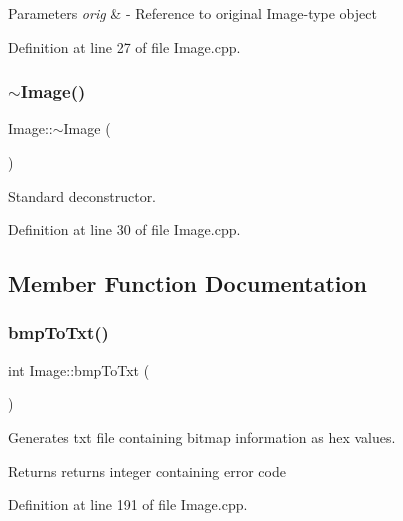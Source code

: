 \begin{DoxyParams}{Parameters}
{\em orig} & -\/ Reference to original Image-\/type object \\
\hline
\end{DoxyParams}


Definition at line 27 of file Image.\+cpp.

\mbox{\label{classImage_a0294f63700543e11c0f0da85601c7ae5}} 
\subsubsection{\texorpdfstring{$\sim$Image()}{~Image()}}
{\footnotesize\ttfamily Image\+::$\sim$\+Image (\begin{DoxyParamCaption}{ }\end{DoxyParamCaption})\hspace{0.3cm}{\ttfamily [virtual]}}

Standard deconstructor. 

Definition at line 30 of file Image.\+cpp.



\subsection{Member Function Documentation}
\mbox{\label{classImage_aa16c9acd068079c676dec4186262b1b7}} 
\subsubsection{\texorpdfstring{bmpToTxt()}{bmpToTxt()}}
{\footnotesize\ttfamily int Image\+::bmp\+To\+Txt (\begin{DoxyParamCaption}{ }\end{DoxyParamCaption})}



Generates txt file containing bitmap information as hex values. 

\begin{DoxyReturn}{Returns}
returns integer containing error code 
\end{DoxyReturn}


Definition at line 191 of file Image.\+cpp.

